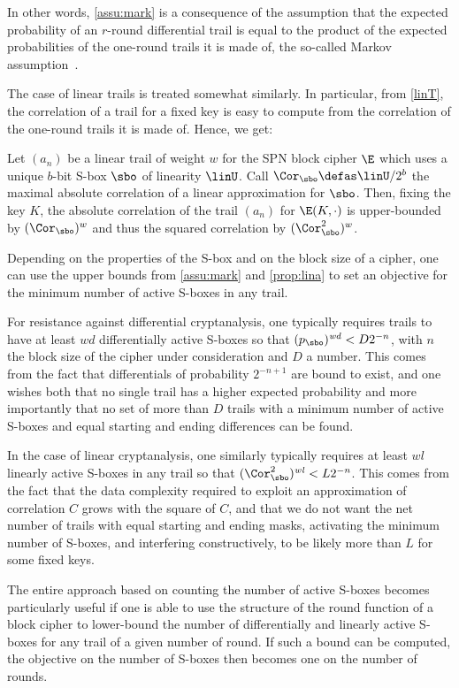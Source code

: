 In other words, \autoref{assu:mark} is a consequence of the assumption that the expected probability of an $r$-round
differential trail is equal to the
product of the expected probabilities of the one-round trails it is made of, \ie the so-called Markov assumption~\cite{idea}.

The case of linear trails is treated somewhat similarly. In particular, from \autoref{linT}, the correlation of
a trail for a fixed key is easy to compute from the correlation of the one-round trails it is made of. Hence, we get:

\begin{prop}
\label{prop:lina}
Let $(a_n)$ be a linear trail of weight $w$ for the SPN block cipher $\E$ which uses a unique $b$-bit S-box $\sbo$ of linearity
$\linU$. Call $\Cor_{\sbo} \defas \linU/2^b$ the maximal absolute correlation of a linear approximation for $\sbo$.
Then, fixing the key $K$, the absolute correlation of the trail $(a_n)$ for $\E(K,\cdot)$ is upper-bounded by $(\Cor_{\sbo})^w$
and thus the squared correlation by $(\Cor_{\sbo}^2)^w$.
\end{prop}

Depending on the properties of the S-box and on the block size of a cipher, one can use the upper bounds
from \autoref{assu:mark} and \autoref{prop:lina} to set an objective for the minimum number of active S-boxes in any trail.

For resistance against differential cryptanalysis, one typically requires trails to have at least $\mathit{wd}$ differentially active
S-boxes so that $(p_{\sbo})^\mathit{wd} < D2^{-n}$, with $n$ the block size of the cipher under consideration and
$D$ a number. This comes from
the fact that differentials of probability $2^{-n+1}$ are bound to exist, and one wishes both that no single trail has a
higher expected probability and more importantly that no set of more than $D$ trails with a minimum number of active
S-boxes and equal starting and ending differences can be found.

In the case of linear cryptanalysis, one similarly typically requires at least $\mathit{wl}$ linearly active
S-boxes in any trail so that $(\Cor_{\sbo}^2)^\mathit{wl} < L2^{-n}$. This comes from the fact that the data complexity required to exploit
an approximation of correlation $C$ grows with the square of $C$, and that we do not want the net number of trails with
equal starting and ending masks, activating
the minimum number of S-boxes, and interfering constructively,
to be likely more than $L$ for some fixed keys.

The entire approach based on counting the number of active S-boxes becomes particularly useful
if one is able to use the structure of the round function of a block cipher to lower-bound the
number of differentially and linearly active S-boxes for any trail of a given number of round. If such a bound can be computed, the objective on the number
of S-boxes then becomes one on the number of rounds.
